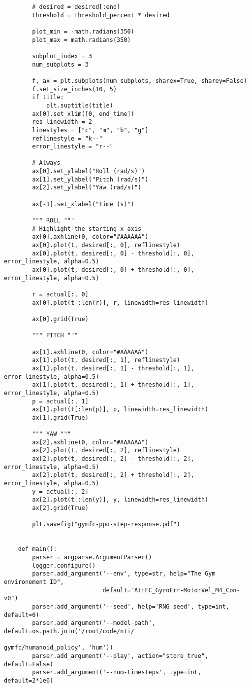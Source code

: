 \begin{verbatim}
        # desired = desired[:end]
        threshold = threshold_percent * desired

        plot_min = -math.radians(350)
        plot_max = math.radians(350)

        subplot_index = 3
        num_subplots = 3

        f, ax = plt.subplots(num_subplots, sharex=True, sharey=False)
        f.set_size_inches(10, 5)
        if title:
            plt.suptitle(title)
        ax[0].set_xlim([0, end_time])
        res_linewidth = 2
        linestyles = ["c", "m", "b", "g"]
        reflinestyle = "k--"
        error_linestyle = "r--"

        # Always
        ax[0].set_ylabel("Roll (rad/s)")
        ax[1].set_ylabel("Pitch (rad/s)")
        ax[2].set_ylabel("Yaw (rad/s)")

        ax[-1].set_xlabel("Time (s)")

        """ ROLL """
        # Highlight the starting x axis
        ax[0].axhline(0, color="#AAAAAA")
        ax[0].plot(t, desired[:, 0], reflinestyle)
        ax[0].plot(t, desired[:, 0] - threshold[:, 0], error_linestyle, alpha=0.5)
        ax[0].plot(t, desired[:, 0] + threshold[:, 0], error_linestyle, alpha=0.5)

        r = actual[:, 0]
        ax[0].plot(t[:len(r)], r, linewidth=res_linewidth)

        ax[0].grid(True)

        """ PITCH """

        ax[1].axhline(0, color="#AAAAAA")
        ax[1].plot(t, desired[:, 1], reflinestyle)
        ax[1].plot(t, desired[:, 1] - threshold[:, 1], error_linestyle, alpha=0.5)
        ax[1].plot(t, desired[:, 1] + threshold[:, 1], error_linestyle, alpha=0.5)
        p = actual[:, 1]
        ax[1].plot(t[:len(p)], p, linewidth=res_linewidth)
        ax[1].grid(True)

        """ YAW """
        ax[2].axhline(0, color="#AAAAAA")
        ax[2].plot(t, desired[:, 2], reflinestyle)
        ax[2].plot(t, desired[:, 2] - threshold[:, 2], error_linestyle, alpha=0.5)
        ax[2].plot(t, desired[:, 2] + threshold[:, 2], error_linestyle, alpha=0.5)
        y = actual[:, 2]
        ax[2].plot(t[:len(y)], y, linewidth=res_linewidth)
        ax[2].grid(True)

        plt.savefig("gymfc-ppo-step-response.pdf")


    def main():
        parser = argparse.ArgumentParser()
        logger.configure()
        parser.add_argument('--env', type=str, help="The Gym environement ID",
                            default="AttFC_GyroErr-MotorVel_M4_Con-v0")
        parser.add_argument('--seed', help='RNG seed', type=int, default=0)
        parser.add_argument('--model-path', default=os.path.join('/root/code/nti/
                                                    gymfc/humanoid_policy', 'hum'))
        parser.add_argument('--play', action="store_true", default=False)
        parser.add_argument('--num-timesteps', type=int, default=2*1e6)


\end{verbatim}
